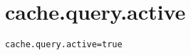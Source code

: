 \section{cache.query.active}
\label{configuration:CacheQueryActive}
\AvailableInJavaOnly{\TODO}
\begin{lstlisting}[style=Props,caption={Usage example for \textit{cache.query.active}}]
cache.query.active=true
\end{lstlisting}
